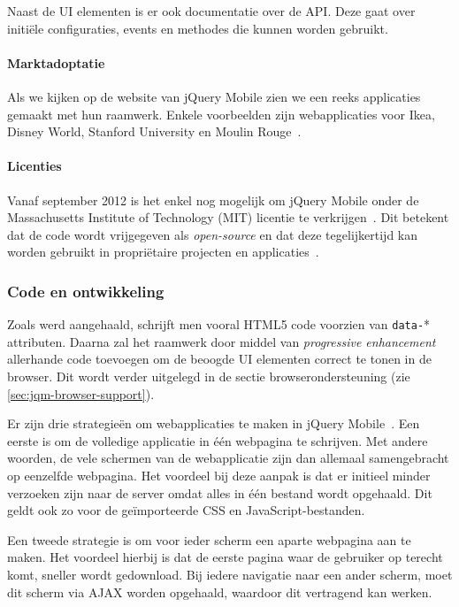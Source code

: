 \documentclass[a4paper]{article}
\newcommand{\term}[1]{\emph{#1}}
\newcommand{\code}[1]{\texttt{#1}}
\begin{document}
Naast de UI elementen is er ook documentatie over de API. Deze gaat over initiële configuraties, events en methodes die kunnen worden gebruikt.

\paragraph{Marktadoptatie}
Als we kijken op de website van jQuery Mobile zien we een reeks applicaties gemaakt met hun raamwerk. Enkele voorbeelden zijn webapplicaties voor Ikea, Disney World, Stanford University en Moulin Rouge~\cite{JQuery2012a}. 

\paragraph{Licenties}
Vanaf september 2012 is het enkel nog mogelijk om jQuery Mobile onder de Massachusetts Institute of Technology (MIT) licentie te verkrijgen~\cite{Dmethvin2012}. Dit betekent dat de code wordt vrijgegeven als \term{open-source} en dat deze tegelijkertijd kan worden gebruikt in propriëtaire projecten en applicaties~\cite{PhilDutson2012}.

\subsubsection{Code en ontwikkeling}
Zoals werd aangehaald, schrijft men vooral HTML5 code voorzien van \code{data-}* attributen. Daarna zal het raamwerk door middel van \term{progressive enhancement} allerhande code toevoegen om de beoogde UI elementen correct te tonen in de browser. Dit wordt verder uitgelegd in de sectie browserondersteuning (zie \ref{sec:jqm-browser-support}).

Er zijn drie strategieën om webapplicaties te maken in jQuery Mobile~\cite{Broulik2012}. Een eerste is om de volledige applicatie in één webpagina te schrijven. Met andere woorden,  de vele schermen van de webapplicatie zijn dan allemaal samengebracht op eenzelfde webpagina. Het voordeel bij deze aanpak is dat er initieel minder verzoeken zijn naar de server omdat alles in één bestand wordt opgehaald. Dit geldt ook zo voor de geïmporteerde CSS en JavaScript-bestanden. 

Een tweede strategie is om voor ieder scherm een aparte webpagina aan te maken. Het voordeel hierbij is dat de eerste pagina waar de gebruiker op terecht komt, sneller wordt gedownload. Bij iedere navigatie naar een ander scherm, moet dit scherm via AJAX worden opgehaald, waardoor dit vertragend kan werken. 
\end{document}
